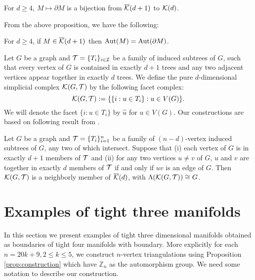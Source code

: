 \documentclass[11pt]{article}
\newcommand{\mb}{\mathbb}
\begin{document}
\begin{prop}\label{P6}
For $d \geq 4$, $M\mapsto \partial M$ is a bijection from
$\overline{\cal K}(d+1)$ to ${\cal K}(d)$.
\end{prop}

From the above proposition, we have the following:
\begin{cor}\label{cor:C1}
For $d\geq 4$, if $M\in \overline{\cal K}(d+1)$ then ${\rm
Aut}(M)={\rm Aut}(\partial M)$.
\end{cor}

Let $G$ be a graph and ${\cal T}=\{T_i\}_{i\in {\cal I}}$ be a family of induced subtrees of $G$, such that every vertex of $G$ is contained in exactly $d+1$ trees and any two adjacent vertices appear together in exactly $d$ trees. We define the pure $d$-dimensional simplicial complex ${\cal K}(G,{\cal T})$ by the following facet complex:
\begin{equation}\label{eq:scdual}
{\cal K}(G,{\cal T}) := \{\{i: u\in T_i\}: u\in V(G)\}.
\end{equation}
We will denote the facet $\{i: u\in T_i\}$ by $\hat{u}$ for $u\in V(G)$.
Our constructions are based on following result from \cite{bdns}.

\begin{prop}\label{prop:construction}
Let $G$ be a graph and ${\cal T} = \{T_i\}_{i=1}^{n}$ be a  family
of $(n-d)$-vertex induced subtrees of $G$, any two of which
intersect. Suppose that {\rm (i)} each vertex of $G$ is in exactly
$d+1$ members of $\cal T$  and {\rm (ii)} for any two vertices
$u\neq v$ of $G$, $u$ and $v$ are together in exactly $d$ members
of $\cal T$ if and only if $uv$ is an edge of $G$. Then ${\cal K}(G,{\cal T})$ is a neighborly member of $\overline{\cal K}(d)$, with
$\Lambda({\cal K}(G,{\cal T}))\cong G$.
\end{prop}

\section{Examples of tight three manifolds}
In this section we present examples of tight three dimensional manifolds
obtained as boundaries of tight four manifolds with boundary. More explicitly
for each $n=20k+9,2\leq k\leq 5$, we construct $n$-vertex triangulations using
Proposition 
\ref{prop:construction} which have $\mb{Z}_n$ as the automorphism group. We
need some notation to describe our construction.
\end{document}
